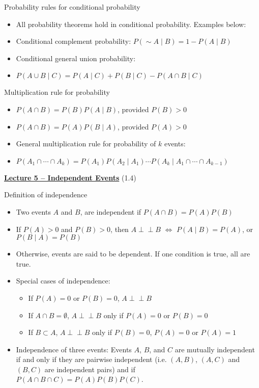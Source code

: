 \documentclass{article}
\newcommand{\bu}[1]{\textbf{\ul{#1}}}				%
\newcommand{\comp}{{\sim}}			%
\newcommand{\ind}{\perp \!\!\! \perp}			%
\begin{document}
Probability rules for conditional probability
\begin{itemize}
    \item All probability theorems hold in conditional probability. Examples below:
    \item Conditional complement probability: $P(\comp A  \mid B) = 1 - P(A  \mid B)$
    \item Conditional general union probability:
    \item[] $P(A \cup B \mid C) = P(A  \mid C) + P(B  \mid C) - P(A \cap B  \mid C)$
\end{itemize}\bigskip

Multiplication rule for probability
\begin{itemize}
    \item $P(A \cap B) = P(B) P(A \mid B)$, provided $P(B) > 0$
    \item $P(A \cap B) = P(A) P(B \mid A)$, provided $P(A) > 0$
    \item General multiplication rule for probability of $k$ events:
    \item[] $P(A_1 \cap \cdots \cap A_k) = P(A_1) P(A_2 \mid A_1) \cdots P(A_k \mid A_1 \cap \cdots \cap A_{k-1})$
\end{itemize}\vspace{80pt}

{\large \bu{Lecture 5 -- Independent Events}} (1.4)\bigskip

Definition of independence
\begin{itemize}
    
    \item Two events $A$ and $B$, are independent if $P(A \cap B) = P(A) P(B)$
    \item[] If $P(A) > 0$ and $P(B) > 0$, then $A \ind B$ $\Longleftrightarrow$ $P(A \mid B) = P(A)$, or $P(B \mid A) = P(B)$
    \item[] Otherwise, events are said to be dependent. If one condition is true, all are true.
    
    \item Special cases of independence:
    \begin{itemize}
        \item If $P(A) = 0$ or $P(B) = 0$, $A \ind B$
        \item If $A \cap B = \emptyset$, $A \ind B$ only if $P(A) = 0$ or $P(B) = 0$
        \item If $B \subset A$, $A \ind B$ only if $P(B) = 0$, $P(A) = 0$ or $P(A) = 1$
    \end{itemize}
    \item Independence of three events: Events $A$, $B$, and $C$ are mutually independent if and only if they are pairwise independent (i.e. $(A, B)$, $(A, C)$ and $(B, C)$ are independent pairs) and if \\ $P(A \cap B \cap C) = P(A) P(B) P(C)$.
\end{itemize}\bigskip
\end{document}
